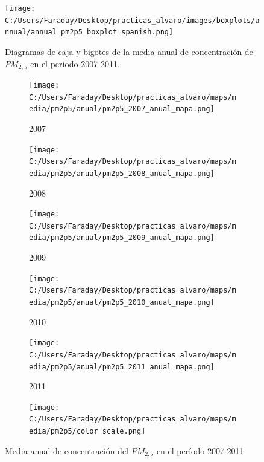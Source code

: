 \documentclass[12pt]{beamer}
\begin{document}
\begin{frame}[squeeze]
\begin{figure}[H]
\centering
\texttt{[image: C:/Users/Faraday/Desktop/practicas\_alvaro/images/boxplots/annual/annual\_pm2p5\_boxplot\_spanish.png]}
\caption{\scriptsize Diagramas de caja y bigotes de la media anual de concentración de $PM_{2,5}$ en el período 2007-2011.}
\label{fig:box_pm2p5_annual}
\end{figure}

\begin{figure}[H]

\centering
\begin{subfigure}[H]{0.18\textwidth}
\texttt{[image: C:/Users/Faraday/Desktop/practicas\_alvaro/maps/media/pm2p5/anual/pm2p5\_2007\_anual\_mapa.png]}
\captionsetup{labelformat=empty}
\caption{\scriptsize 2007}
\end{subfigure}
%
\begin{subfigure}[H]{0.18\textwidth}
\texttt{[image: C:/Users/Faraday/Desktop/practicas\_alvaro/maps/media/pm2p5/anual/pm2p5\_2008\_anual\_mapa.png]}
\captionsetup{labelformat=empty}
\caption{\scriptsize 2008}
\end{subfigure}
%
\begin{subfigure}[H]{0.18\textwidth}
\texttt{[image: C:/Users/Faraday/Desktop/practicas\_alvaro/maps/media/pm2p5/anual/pm2p5\_2009\_anual\_mapa.png]}
\captionsetup{labelformat=empty}
\caption{\scriptsize 2009}
\end{subfigure}
%
\begin{subfigure}[H]{0.18\textwidth}
\texttt{[image: C:/Users/Faraday/Desktop/practicas\_alvaro/maps/media/pm2p5/anual/pm2p5\_2010\_anual\_mapa.png]}
\captionsetup{labelformat=empty}
\caption{\scriptsize 2010}
\end{subfigure}
%
\begin{subfigure}[H]{0.18\textwidth}
\texttt{[image: C:/Users/Faraday/Desktop/practicas\_alvaro/maps/media/pm2p5/anual/pm2p5\_2011\_anual\_mapa.png]}
\captionsetup{labelformat=empty}
\caption{\scriptsize 2011}
\end{subfigure}

\begin{subfigure}[H]{0.45\textwidth}
\texttt{[image: C:/Users/Faraday/Desktop/practicas\_alvaro/maps/media/pm2p5/color\_scale.png]}
\captionsetup{labelformat=empty}
\caption{}
\end{subfigure}

\vspace*{-7mm}
\caption{\scriptsize Media anual de concentración del $PM_{2,5}$ en el período 2007-2011.}
\label{fig:map-pm2p5-anual}
\end{figure}
\end{frame}
\end{document}
